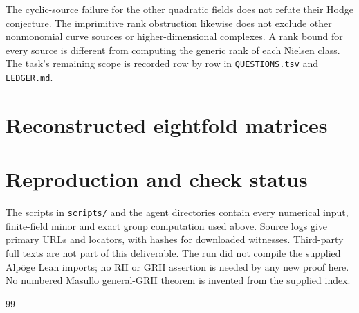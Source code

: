\documentclass[11pt]{article}
\theoremstyle{remark}\newtheorem{remark}[theorem]{Remark}
\begin{document}
The cyclic-source failure for the other quadratic fields does not refute
their Hodge conjecture. The imprimitive rank obstruction likewise
does not exclude other nonmonomial curve sources or higher-dimensional
complexes. A rank bound for every source is different from computing
the generic rank of each Nielsen class. The task's remaining scope is
recorded row by row in \texttt{QUESTIONS.tsv} and \texttt{LEDGER.md}.

\appendix
\section{Reconstructed eightfold matrices}

\section{Reproduction and check status}
The scripts in \texttt{scripts/} and the agent directories contain every
numerical input, finite-field minor and exact group computation used
above. Source logs give primary URLs and locators, with hashes for
downloaded witnesses. Third-party full texts are not part of this
deliverable. The run did not compile the supplied Alp\"oge Lean imports;
no RH or GRH assertion is needed by any new proof here. No numbered
Masullo general-GRH theorem is invented from the supplied index.

\begin{thebibliography}{99}



\end{thebibliography}
\end{document}
